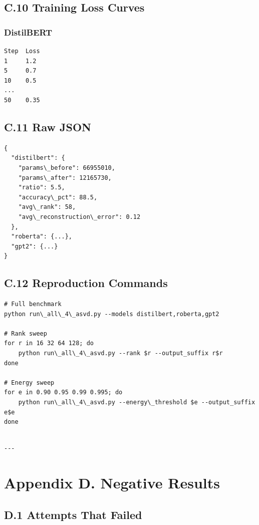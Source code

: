 \subsection{C.10 Training Loss Curves}

\subsubsection{DistilBERT}
\begin{lstlisting}
Step  Loss
1     1.2
5     0.7
10    0.5
...
50    0.35
\end{lstlisting}

\subsection{C.11 Raw JSON}

\begin{lstlisting}
{
  "distilbert": {
    "params\_before": 66955010,
    "params\_after": 12165730,
    "ratio": 5.5,
    "accuracy\_pct": 88.5,
    "avg\_rank": 58,
    "avg\_reconstruction\_error": 0.12
  },
  "roberta": {...},
  "gpt2": {...}
}
\end{lstlisting}

\subsection{C.12 Reproduction Commands}

\begin{lstlisting}
# Full benchmark
python run\_all\_4\_asvd.py --models distilbert,roberta,gpt2

# Rank sweep
for r in 16 32 64 128; do
    python run\_all\_4\_asvd.py --rank $r --output_suffix r$r
done

# Energy sweep
for e in 0.90 0.95 0.99 0.995; do
    python run\_all\_4\_asvd.py --energy\_threshold $e --output_suffix e$e
done
\end{lstlisting}
\begin{lstlisting}

---
\end{lstlisting}


\section{Appendix D. Negative Results}

\subsection{D.1 Attempts That Failed}

